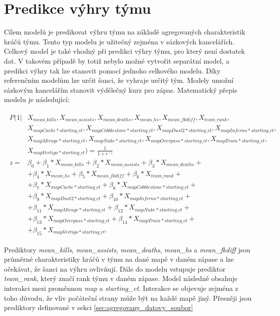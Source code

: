 \newpage
\section{Predikce výhry týmu}
Cílem modelů je predikovat výhru týmu na základě agregovaných charakteristik hráčů týmu. Tento typ modelu je užitečný zejména v sázkových kancelářích.
Celkový model je také vhodný při predikci výhry týmu, pro který není dostatek dat. V takovém případě by totiž nebylo možné vytvořit separátní model, a predikci výhry tak
lze stanovit pomocí jednoho celkového modelu. Díky referenčním modelům lze určit šanci, že vyhraje určitý tým. Modely umožní sázkovým kancelářím stanovit výdělečný kurz pro zápas.
Matematický přepis modelu je následující:

\begin{align}
    \begin{split}
        P(1 | &X_{mean\_kills}, X_{mean\_assists}, X_{mean\_deaths}, X_{mean\_hs}, X_{mean\_fkdiff}, X_{team\_rank}, \\
              &X_{mapCache*starting\_ct}, X_{mapCobblestone*starting\_ct}, X_{mapDust2*starting\_ct}, X_{mapInferno*starting\_ct}, \\
              &X_{mapMirage*starting\_ct}, X_{mapNuke*starting\_ct}, X_{mapOverpass*starting\_ct}, X_{mapTrain*starting\_ct}, \\
              &X_{mapVertigo*starting\_ct}) = \frac{1}{1 + e^{-z}} \\
        z = &\beta_0 + \beta_1*X_{mean\_kills} + \beta_2*X_{mean\_assists} + \beta_3*X_{mean\_deaths} + \\
            &+ \beta_4*X_{mean\_hs} + \beta_5*X_{mean\_fkdiff} + \beta_6*X_{team\_rank} + \\
            &+ \beta_7*X_{mapCache*starting\_ct} + \beta_8*X_{mapCobblestone*starting\_ct} + \\
            &+ \beta_9*X_{mapDust2*starting\_ct} +\beta_{10}*X_{mapInferno*starting\_ct} + \\
            &+ \beta_{11}*X_{mapMirage*starting\_ct} + \beta_{12}*X_{mapNuke*starting\_ct} + \\
            &+ \beta_{13}*X_{mapOverpass*starting\_ct} + \beta_{14}*X_{mapTrain*starting\_ct} + \\
            &+ \beta_{15}*X_{mapVertigo*starting\_ct}.
    \end{split}
\end{align}

Prediktory \textit{mean\_kills}, \textit{mean\_assists}, \textit{mean\_deaths}, \textit{mean\_hs} a  \textit{mean\_fkdiff} jsou průměrné charakteristiky hráčů v týmu na dané mapě
v daném zápase a lze očekávat, že šanci na výhru ovlivňují. Dále do modelu vstupuje prediktor \textit{team\_rank}, který značí rank týmu v daném zápase. Model následně
obsahuje interakci mezi proměnnou \textit{map} a \textit{starting\_ct}. Interakce se objevuje zejména z toho důvodu, že vliv počáteční strany může být na každé mapě jiný.
Přesněji jsou prediktory
definované v sekci \ref{sec:agregovany_datovy_soubor}

